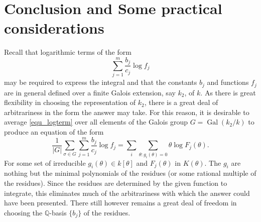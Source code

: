 \documentclass[12pt,reqno]{amsart}
\numberwithin{equation}{section}
\newcommand{\bbQ}[0]  { \mathbb{Q}}
\begin{document}
\section{Conclusion and Some practical considerations}
Recall that logarithmic terms of the form
\begin{equation}
\label{equ_logterm}
 \sum_{j=1}^{m} \frac{b_j}{c_j} \log f_j
\end{equation}
may be required to express the integral and that the constants $b_j$ and functions $f_j$ are in general defined over a finite Galois extension, say $k_2$, of $k$. As there is great flexibility in choosing the representation of $k_2$, there is a great deal of arbitrariness in the form the answer may take. For this reason, it is desirable to average \eqref{equ_logterm} over all elements of the Galois group $G=\operatorname{Gal}(k_2/k)$ to produce an equation of the form
\begin{equation}
\label{equ_logterm_avg}
\frac{1}{|G|} \sum_{\sigma \in G} \sum_{j=1}^{m} \frac{b_j}{c_j} \log f_j = \sum_{i} \sum_{\theta:g_i(\theta)=0} \theta \log F_j(\theta)\text{.}
\end{equation}
For some set of irreducible $g_i(\theta) \in k[\theta]$ and $F_j(\theta)$ in $K(\theta)$. The $g_i$ are nothing but the minimal polynomials of the residues (or some rational multiple of the residues). Since the residues are determined by the given function to integrate, this eliminates much of the arbitrariness with which the answer could have been presented. There still however remains a great deal of freedom in choosing the $\bbQ$-basis $\{b_j\}$ of the residues.
\end{document}
